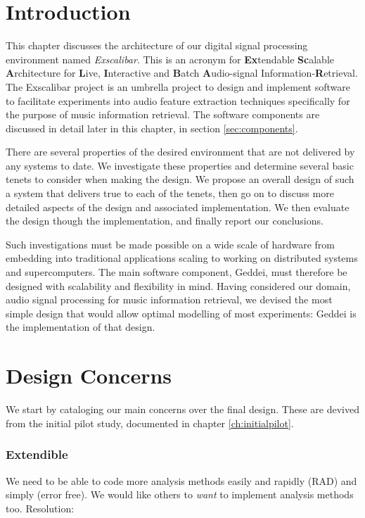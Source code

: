 \section{Introduction}

This chapter discusses the architecture of our digital signal processing environment named \textit{Exscalibar}. This is an acronym for \textbf{Ex}tendable \textbf{Sc}alable \textbf{A}rchitecture for \textbf{L}ive, \textbf{I}nteractive and \textbf{B}atch \textbf{A}udio-signal Information-\textbf{R}etrieval. The Exscalibar project is an umbrella project to design and implement software to facilitate experiments into audio feature extraction techniques specifically for the purpose of music information retrieval. The software components are discussed in detail later in this chapter, in section \ref{sec:components}.

There are several properties of the desired environment that are not delivered by any systems to date. We investigate these properties and determine several basic tenets to consider when making the design. We propose an overall design of such a system that delivers true to each of the tenets, then go on to discuss more detailed aspects of the design and associated implementation. We then evaluate the design though the implementation, and finally report our conclusions.

Such investigations must be made possible on a wide scale of hardware from embedding into traditional applications scaling to working on distributed systems and supercomputers. The main software component, Geddei, must therefore be designed with scalability and flexibility in mind. Having considered our domain, audio signal processing for music information retrieval, we devised the most simple design that would allow optimal modelling of most experiments: Geddei is the implementation of that design.

\section{Design Concerns}

We start by cataloging our main concerns over the final design. These are devived from the initial pilot study, documented in chapter \ref{ch:initialpilot}.

\subsubsection{Extendible}

We need to be able to code more analysis methods easily and rapidly (RAD) and simply (error free). We would like others to \textit{want} to implement analysis methods too. Resolution:

